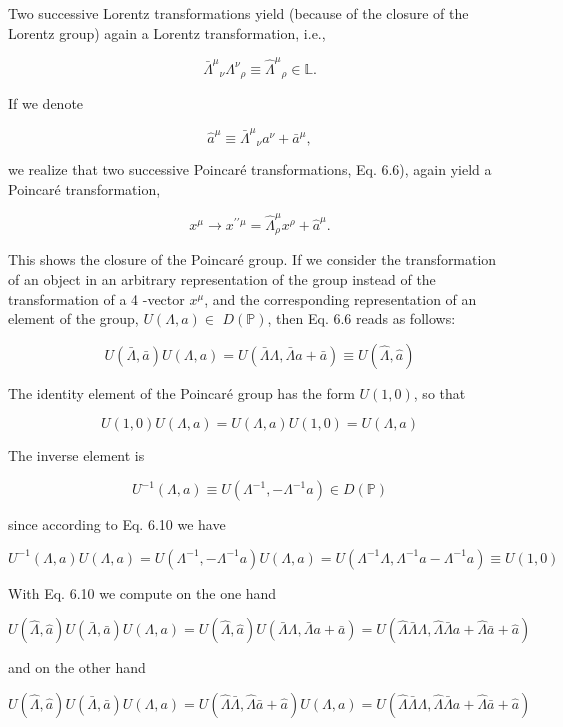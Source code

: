 \documentclass[10pt, letterpaper]{article}
\begin{document}
Two successive Lorentz transformations yield (because of the closure of the Lorentz group) again a Lorentz transformation, i.e.,

$$
\bar{\Lambda}^{\mu}{ }_{\nu} \Lambda^{\nu}{ }_{\rho} \equiv \hat{\Lambda}^{\mu}{ }_{\rho} \in \mathbb{L} .
$$

If we denote

$$
\hat{a}^{\mu} \equiv \bar{\Lambda}^{\mu}{ }_{\nu} a^{\nu}+\bar{a}^{\mu},
$$

we realize that two successive Poincaré transformations, Eq. 6.6), again yield a Poincaré transformation,

$$
x^{\mu} \longrightarrow x^{\prime \prime \mu}=\hat{\Lambda}_{\rho}^{\mu} x^{\rho}+\hat{a}^{\mu} .
$$

This shows the closure of the Poincaré group. If we consider the transformation of an object in an arbitrary representation of the group instead of the transformation of a 4 -vector $x^{\mu}$, and the corresponding representation of an element of the group, $U(\Lambda, a) \in$ $D(\mathbb{P})$, then Eq. 6.6 reads as follows:

$$
U(\bar{\Lambda}, \bar{a}) U(\Lambda, a)=U(\bar{\Lambda} \Lambda, \bar{\Lambda} a+\bar{a}) \equiv U(\hat{\Lambda}, \hat{a})
$$

The identity element of the Poincaré group has the form $U(1,0)$, so that

$$
U(1,0) U(\Lambda, a)=U(\Lambda, a) U(1,0)=U(\Lambda, a)
$$

The inverse element is

$$
U^{-1}(\Lambda, a) \equiv U\left(\Lambda^{-1},-\Lambda^{-1} a\right) \in D(\mathbb{P})
$$

since according to Eq. 6.10 we have

$$
U^{-1}(\Lambda, a) U(\Lambda, a)=U\left(\Lambda^{-1},-\Lambda^{-1} a\right) U(\Lambda, a)=U\left(\Lambda^{-1} \Lambda, \Lambda^{-1} a-\Lambda^{-1} a\right) \equiv U(1,0)
$$

With Eq. 6.10 we compute on the one hand

$$
U(\hat{\Lambda}, \hat{a}) U(\bar{\Lambda}, \bar{a}) U(\Lambda, a)=U(\hat{\Lambda}, \hat{a}) U(\bar{\Lambda} \Lambda, \bar{\Lambda} a+\bar{a})=U(\hat{\Lambda} \bar{\Lambda} \Lambda, \hat{\Lambda} \bar{\Lambda} a+\hat{\Lambda} \bar{a}+\hat{a})
$$

and on the other hand

$$
U(\hat{\Lambda}, \hat{a}) U(\bar{\Lambda}, \bar{a}) U(\Lambda, a)=U(\hat{\Lambda} \bar{\Lambda}, \hat{\Lambda} \bar{a}+\hat{a}) U(\Lambda, a)=U(\hat{\Lambda} \bar{\Lambda} \Lambda, \hat{\Lambda} \bar{\Lambda} a+\hat{\Lambda} \bar{a}+\hat{a})
$$
\end{document}
